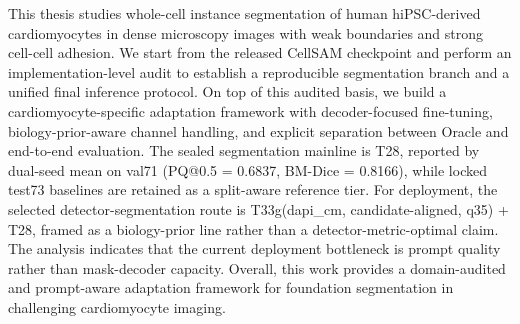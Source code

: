 This thesis studies whole-cell instance segmentation of human hiPSC-derived cardiomyocytes in dense microscopy images with weak boundaries and strong cell-cell adhesion. We start from the released CellSAM checkpoint and perform an implementation-level audit to establish a reproducible segmentation branch and a unified final inference protocol. On top of this audited basis, we build a cardiomyocyte-specific adaptation framework with decoder-focused fine-tuning, biology-prior-aware channel handling, and explicit separation between Oracle and end-to-end evaluation. The sealed segmentation mainline is T28, reported by dual-seed mean on val71 (PQ@0.5 = 0.6837, BM-Dice = 0.8166), while locked test73 baselines are retained as a split-aware reference tier. For deployment, the selected detector-segmentation route is T33g(dapi\_cm, candidate-aligned, q35) + T28, framed as a biology-prior line rather than a detector-metric-optimal claim. The analysis indicates that the current deployment bottleneck is prompt quality rather than mask-decoder capacity. Overall, this work provides a domain-audited and prompt-aware adaptation framework for foundation segmentation in challenging cardiomyocyte imaging.
